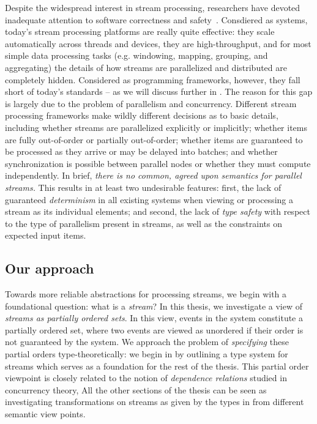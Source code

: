 Despite the widespread interest in stream processing, researchers have devoted inadequate attention to software correctness and safety~.
Consdiered as systems, today's stream processing platforms are really quite effective: they scale automatically across threads and devices, they are high-throughput, and for most simple data processing tasks (e.g. windowing, mapping, grouping, and aggregating) the details of how streams are parallelized and distributed are completely hidden. Considered as programming frameworks, however, they fall short of today's standards -- as we will discuss further in . The reason for this gap is largely due to the problem of parallelism and concurrency. Different stream processing frameworks make wildly different decisions as to basic details, including whether streams are parallelized explicitly or implicitly; whether items are fully out-of-order or partially out-of-order; whether items are guaranteed to be processed as they arrive or may be delayed into batches; and whether synchronization is possible between parallel nodes or whether they must compute independently.
In brief, \emph{there is no common, agreed upon semantics for parallel streams.}
This results in at least two undesirable features: first, the lack of guaranteed \emph{determinism} in all existing systems when viewing or processing a stream as its individual elements; and second, the lack of \emph{type safety} with respect to the type of parallelism present in streams, as well as the constraints on expected input items.

\subsection{Our approach}

Towards more reliable abstractions for processing streams, we begin with a foundational question: what is a \emph{stream}?
In this thesis, we investigate a view of \emph{streams as partially ordered sets}.
In this view, events in the system constitute a partially ordered set,
where two events are viewed as unordered if their order
is not guaranteed by the system.
We approach the problem of \emph{specifying} these partial orders type-theoretically: we begin in  by
outlining a type system for streams which serves as a foundation for the rest of the thesis.
This partial order viewpoint is closely related to the notion of \emph{dependence relations} studied in concurrency theory,
All the other sections of the thesis can be seen as investigating transformations on streams as given by the types in  from different semantic view points.


